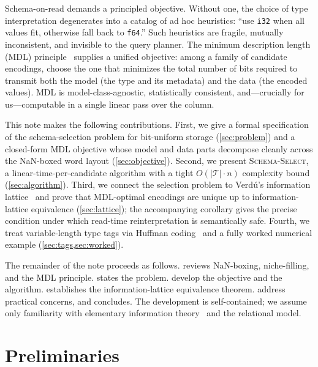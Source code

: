 \documentclass[10pt]{article}
\theoremstyle{definition}
\theoremstyle{remark}
\newcommand{\Tcal}{\mathcal{T}}
\begin{document}
Schema-on-read demands a principled objective. Without one, the choice of
type interpretation degenerates into a catalog of ad hoc heuristics: ``use
\texttt{i32} when all values fit, otherwise fall back to \texttt{f64}.''
Such heuristics are fragile, mutually inconsistent, and invisible to the
query planner. The minimum description length (MDL)
principle~\citep{rissanen1978,grunwald2004,barron1998} supplies a unified
objective: among a family of candidate encodings, choose the one that
minimizes the total number of bits required to transmit both the model
(the type and its metadata) and the data (the encoded values). MDL is
model-class-agnostic, statistically consistent, and---crucially for
us---computable in a single linear pass over the column.

This note makes the following contributions. First, we give a formal
specification of the schema-selection problem for bit-uniform storage
(\cref{sec:problem}) and a closed-form MDL objective whose model and data
parts decompose cleanly across the NaN-boxed word layout
(\cref{sec:objective}). Second, we present \textsc{Schema-Select}, a
linear-time-per-candidate algorithm with a tight $O(|\Tcal| \cdot n)$
complexity bound (\cref{sec:algorithm}). Third, we connect the selection
problem to Verd\'u's information lattice~\citep{verdu} and prove that
MDL-optimal encodings are unique up to information-lattice equivalence
(\cref{sec:lattice}); the accompanying corollary gives the precise
condition under which read-time reinterpretation is semantically safe.
Fourth, we treat variable-length type tags via Huffman
coding~\citep{huffman1952} and a fully worked numerical example
(\cref{sec:tags,sec:worked}).

The remainder of the note proceeds as follows.  reviews
NaN-boxing, niche-filling, and the MDL principle. 
states the problem.  develop the
objective and the algorithm.  establishes the
information-lattice equivalence theorem.
 address practical concerns, and
 concludes. The development is self-contained; we assume
only familiarity with elementary information theory~\citep{coverthomas}
and the relational model.

\section{Preliminaries}\label{sec:prelim}
\end{document}
